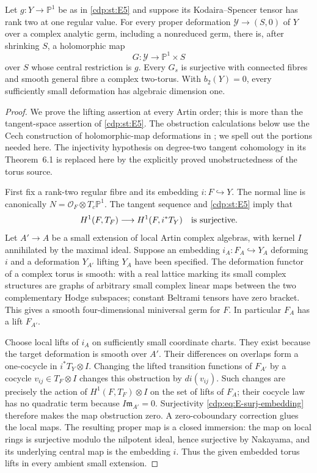 
\begin{proposition}\label{cdp:st:E6}
Let $g:Y\to\mathbb P^1$ be as in \ref{cdp:st:E5} and suppose its
Kodaira--Spencer tensor has rank two at one regular value. For every
proper deformation $\mathcal Y\to(S,0)$ of $Y$ over a complex
analytic germ, including a nonreduced germ, there is, after shrinking
$S$, a holomorphic map
\[
 G:\mathcal Y\longrightarrow\mathbb P^1\times S
\]
over $S$ whose central restriction is $g$. Every $G_s$ is surjective
with connected fibres and smooth general fibre a complex two-torus.
With $b_2(Y)=0$, every sufficiently small deformation has algebraic
dimension one.
\end{proposition}
\begin{proof}
We prove the lifting assertion at every Artin order; this is more
than the tangent-space assertion of \ref{cdp:st:E5}. The obstruction calculations
below use the Cech construction of holomorphic-map deformations
in \cite[\S4, equations (4.3)--(4.5), and \S6]{Horikawa1974};
we spell out the portions needed here. The injectivity hypothesis
on degree-two tangent cohomology in its Theorem~6.1 is replaced
here by the explicitly proved unobstructedness of the torus source.

First fix a rank-two regular fibre and its embedding $i:F\hookrightarrow
Y$. The normal line is canonically $N=\mathcal O_F\otimes T_c\mathbb
P^1$. The tangent sequence and \ref{cdp:st:E5} imply that
\begin{equation}\label{cdp:eq:E-surj-embedding}
 H^1(F,T_F)\longrightarrow H^1(F,i^*T_Y)
 \quad\hbox{is surjective}.
\end{equation}
Let $A'\to A$ be a small extension of local Artin complex algebras,
with kernel $I$ annihilated by the maximal ideal. Suppose an embedding
$i_A:F_A\hookrightarrow Y_A$ deforming $i$ and a deformation
$Y_{A'}$ lifting $Y_A$ have been specified. The deformation functor
of a complex torus is smooth: with a real lattice marking its small
complex structures are graphs of arbitrary small complex linear maps
between the two complementary Hodge subspaces; constant Beltrami
tensors have zero bracket. This gives a smooth four-dimensional
miniversal germ for $F$. In particular $F_A$ has a lift $F_{A'}$.

Choose local lifts of $i_A$ on sufficiently small coordinate charts.
They exist because the target deformation is smooth over $A'$.
Their differences on overlaps form a one-cocycle in
$i^*T_Y\otimes I$. Changing the lifted transition functions of
$F_{A'}$ by a cocycle $v_{ij}\in T_F\otimes I$ changes this
obstruction by $di(v_{ij})$. Such changes are precisely the action
of $H^1(F,T_F)\otimes I$ on the set of lifts of $F_A$; their
cocycle law has no quadratic term because $I\mathfrak m_{A'}=0$.
Surjectivity \eqref{cdp:eq:E-surj-embedding} therefore makes the map
obstruction zero. A zero-coboundary correction glues the local maps.
The resulting proper map is a closed immersion: the map on local
rings is surjective modulo the nilpotent ideal, hence surjective
by Nakayama, and its underlying central map is the embedding $i$.
Thus the given embedded torus lifts in every ambient small extension.


\end{proof}
